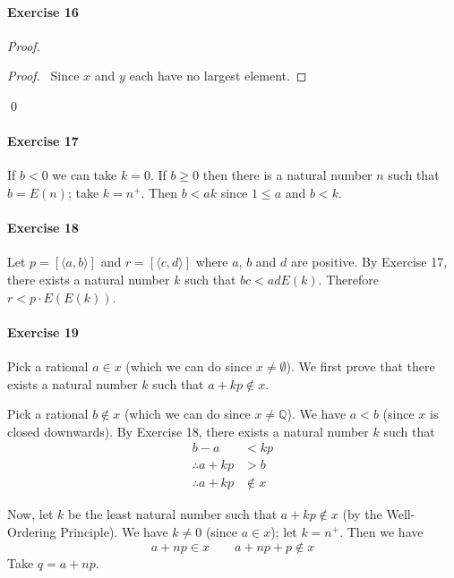 \documentclass{report}
\begin{document}
    \paragraph{Exercise 16}
    \begin{proof}
        \pf
        \begin{proof}
            \pf\ Since $x$ and $y$ each have no largest element.
        \end{proof}
        \qed
    \end{proof}

    \paragraph{Exercise 17}
    If $b < 0$ we can take $k = 0$. If $b \geq 0$ then there is a natural number $n$ such that $b = E(n)$;
    take $k = n^+$. Then $b < ak$ since $1 \leq a$ and $b < k$.

    \paragraph{Exercise 18}
    Let $p = [\langle a,b \rangle]$ and $r = [\langle c,d \rangle]$ where $a$, $b$ and $d$ are positive.
    By Exercise 17, there exists a natural number $k$ such that $bc < ad E(k)$. Therefore $r < p \cdot E(E(k))$.

    \paragraph{Exercise 19}
    Pick a rational $a \in x$ (which we can do since $x \neq \emptyset$). We first prove that there exists
    a natural number $k$ such that $a + kp \notin x$.

    Pick a rational $b \notin x$ (which we can do since $x \neq \mathbb{Q}$). We have $a < b$ (since $x$ is
    closed downwards). By Exercise 18, there exists a natural number $k$ such that
    \begin{align*}
        b - a & < kp \\
        \therefore a + kp & > b \\
        \therefore a + kp & \notin x
    \end{align*}

    Now, let $k$ be the least natural number such that $a + kp \notin x$ (by the Well-Ordering Principle).
    We have $k \neq 0$ (since $a \in x$);
    let $k = n^+$. Then we have
    \[ a + np \in x \qquad a + np + p \notin x \]
    Take $q = a + np$.
\end{document}
